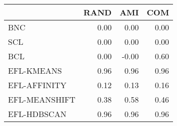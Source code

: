 \begin{tabular}{lrrr}
\toprule
 & RAND & AMI & COM \\
\midrule
BNC & 0.00 & 0.00 & 0.00 \\
SCL & 0.00 & 0.00 & 0.00 \\
BCL & 0.00 & -0.00 & 0.60 \\
EFL-KMEANS & 0.96 & 0.96 & 0.96 \\
EFL-AFFINITY & 0.12 & 0.13 & 0.16 \\
EFL-MEANSHIFT & 0.38 & 0.58 & 0.46 \\
EFL-HDBSCAN & 0.96 & 0.96 & 0.96 \\
\bottomrule
\end{tabular}
